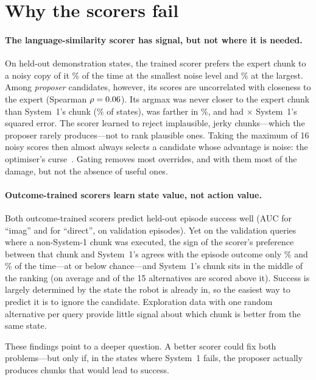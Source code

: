 \documentclass{article}
\begin{document}
\section{Why the scorers fail}
\label{sec:why}

\paragraph{The language-similarity scorer has signal, but not where it is needed.} On \diagN{} held-out demonstration states, the trained scorer prefers the expert chunk to a noisy copy of it \diagPairLow\% of the time at the smallest noise level and \diagPairHigh\% at the largest. Among \emph{proposer} candidates, however, its scores are uncorrelated with closeness to the expert (Spearman $\rho=0.06$). Its argmax was never closer to the expert chunk than System~1's chunk (\diagCloser\% of states), was farther in \diagFarther\%, and had \diagMseRatio$\times$ System~1's squared error. The scorer learned to reject implausible, jerky chunks---which the proposer rarely produces---not to rank plausible ones. Taking the maximum of 16 noisy scores then almost always selects a candidate whose advantage is noise: the optimiser's curse~\citep{smith2006optimizer}. Gating removes most overrides, and with them most of the damage, but not the absence of useful ones.

\paragraph{Outcome-trained scorers learn state value, not action value.} Both outcome-trained scorers predict held-out episode success well (AUC \aucImag{} for ``imag'' and \aucDirect{} for ``direct'', on \valEpisodes{} validation episodes). Yet on the validation queries where a non-System-1 chunk was executed, the sign of the scorer's preference between that chunk and System~1's agrees with the episode outcome only \rankImag\% and \rankDirect\% of the time---at or below chance---and System~1's chunk sits in the middle of the ranking (on average \sOneRankImag{} and \sOneRankDirect{} of the 15 alternatives are scored above it). Success is largely determined by the state the robot is already in, so the easiest way to predict it is to ignore the candidate. Exploration data with one random alternative per query provide little signal about which chunk is better from the same state.

These findings point to a deeper question. A better scorer could fix both problems---but only if, in the states where System~1 fails, the proposer actually produces chunks that would lead to success.
\end{document}
